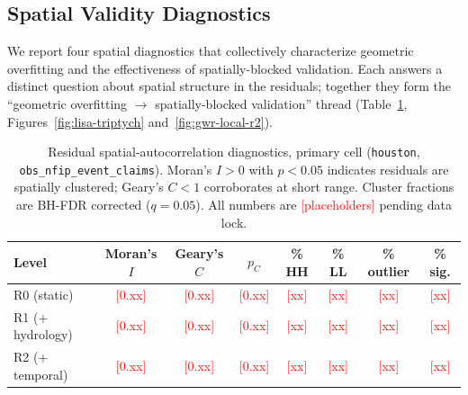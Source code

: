%
%

\newcommand{\PH}[1]{\textcolor{red}{[#1]}}  %

\subsection{Spatial Validity Diagnostics}
\label{sec:spatial-diagnostics}

We report four spatial diagnostics that collectively characterize
geometric overfitting and the effectiveness of spatially-blocked
validation. Each answers a distinct question about spatial structure
in the residuals; together they form the ``geometric overfitting
$\to$ spatially-blocked validation'' thread
(Table~\ref{tab:residual-diagnostics}, Figures~\ref{fig:lisa-triptych}
and~\ref{fig:gwr-local-r2}).



\begin{table}[t]
\centering
\caption{Residual spatial-autocorrelation diagnostics, primary cell
  (\texttt{houston}, \texttt{obs\_nfip\_event\_claims}).
  Moran's $I > 0$ with $p < 0.05$ indicates residuals are
  spatially clustered; Geary's $C < 1$ corroborates at short range.
  Cluster fractions are BH-FDR corrected ($q = 0.05$).
  All numbers are \PH{placeholders} pending data lock.}
\label{tab:residual-diagnostics}
\small
\begin{tabular}{@{}lccccccc@{}}
\toprule
\textbf{Level} &
  \textbf{Moran's $I$} &
  \textbf{Geary's $C$} &
  \textbf{$p_C$} &
  \textbf{\% HH} &
  \textbf{\% LL} &
  \textbf{\% outlier} &
  \textbf{\% sig.} \\
\midrule
R0 (static)       & \PH{0.xx} & \PH{0.xx} & \PH{0.xx} & \PH{xx} & \PH{xx} & \PH{xx} & \PH{xx} \\
R1 (+ hydrology)  & \PH{0.xx} & \PH{0.xx} & \PH{0.xx} & \PH{xx} & \PH{xx} & \PH{xx} & \PH{xx} \\
R2 (+ temporal)   & \PH{0.xx} & \PH{0.xx} & \PH{0.xx} & \PH{xx} & \PH{xx} & \PH{xx} & \PH{xx} \\
\bottomrule
\end{tabular}
\end{table}


